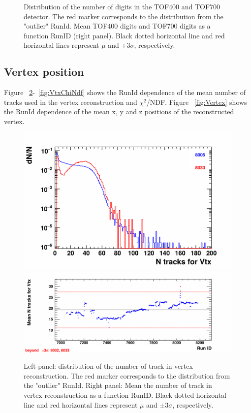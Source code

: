 \begin{figure}[H]
\begin{center}
{            \label{fig:TOF700digitsRun} }
        \vspace{-3mm}
        \caption{Distribution of the number of digits in the TOF400  and TOF700  detector. The red marker corresponds to the distribution from the "outlier" RunId. Mean TOF400 digits  and TOF700 digits  as a function RunID (right panel). Black dotted horizontal line and red horizontal lines represent $\mu$ and $\pm3\sigma$, respectively.}
        \label{fig:DigitsQA_tof}
        \end{center}
        \vspace{-5mm}
    \end{figure}




\subsection{Vertex position}\label{VtxPosit}
    
    Figure ~\ref{fig:VtxNTracks}-~\ref{fig:VtxChiNdf} shows the RunId dependence of the mean number of tracks used in the vertex reconstruction and $\chi^2$/NDF. Figure ~\ref{fig:Vertex} shows the RunId dependence of the mean x, y and z positions of the reconstructed vertex.

    \begin{figure}[H]
        \begin{center}
            \includegraphics[width=0.35\linewidth]{../pict/QA_RunByRun_24.12/H1/nVtxTr_h2_RunId_vtx_n_tracks.png}
            \includegraphics[width=0.60\linewidth]{../pict/QA_RunByRun_24.12/nVtxTr_h2_RunId_vtx_n_tracks.png}
            \vspace{-3mm}
            \caption{Left panel: distribution of the number of track in vertex reconstruction. The red marker corresponds to the distribution from the "outlier" RunId. Right panel: Mean the number of track in vertex reconstruction as a function RunID. Black dotted horizontal line and red horizontal lines represent $\mu$ and $\pm3\sigma$, respectively.}
            \label{fig:VtxNTracks}
        \end{center}
        \vspace{-5mm}
    \end{figure}


